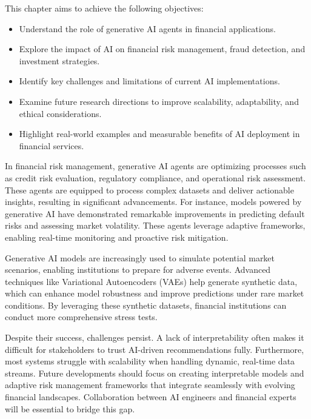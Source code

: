 \documentclass[a4paper,headinclude=on,footinclude=on,12pt,oneside]{scrbook}
\begin{document}
	
	This chapter aims to achieve the following objectives:
	
	\begin{itemize}
		\item Understand the role of generative AI agents in financial applications.
		\item Explore the impact of AI on financial risk management, fraud detection, and investment strategies.
		\item Identify key challenges and limitations of current AI implementations.
		\item Examine future research directions to improve scalability, adaptability, and ethical considerations.
		\item Highlight real-world examples and measurable benefits of AI deployment in financial services.
	\end{itemize}
	
	
	In financial risk management, generative AI agents are optimizing processes such as credit risk evaluation, regulatory compliance, and operational risk assessment. These agents are equipped to process complex datasets and deliver actionable insights, resulting in significant advancements. For instance, models powered by generative AI have demonstrated remarkable improvements in predicting default risks and assessing market volatility. These agents leverage adaptive frameworks, enabling real-time monitoring and proactive risk mitigation.
	
	Generative AI models are increasingly used to simulate potential market scenarios, enabling institutions to prepare for adverse events. Advanced techniques like Variational Autoencoders (VAEs) help generate synthetic data, which can enhance model robustness and improve predictions under rare market conditions. By leveraging these synthetic datasets, financial institutions can conduct more comprehensive stress tests.
	
	Despite their success, challenges persist. A lack of interpretability often makes it difficult for stakeholders to trust AI-driven recommendations fully. Furthermore, most systems struggle with scalability when handling dynamic, real-time data streams. Future developments should focus on creating interpretable models and adaptive risk management frameworks that integrate seamlessly with evolving financial landscapes. Collaboration between AI engineers and financial experts will be essential to bridge this gap.
	
\end{document}
